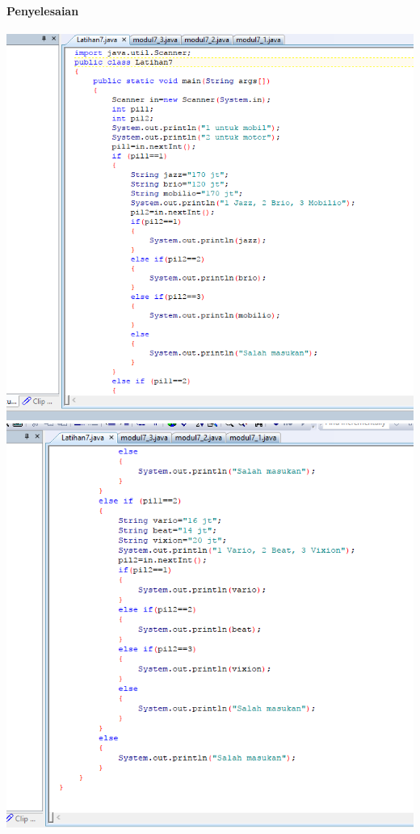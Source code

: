 \documentclass[a4paper,12pt]{article}
\begin{document}
\paragraph{Penyelesaian\\}
\includegraphics[width=\linewidth]{image--015}\\
\includegraphics[width=\linewidth]{image--016}\\
\end{document}
